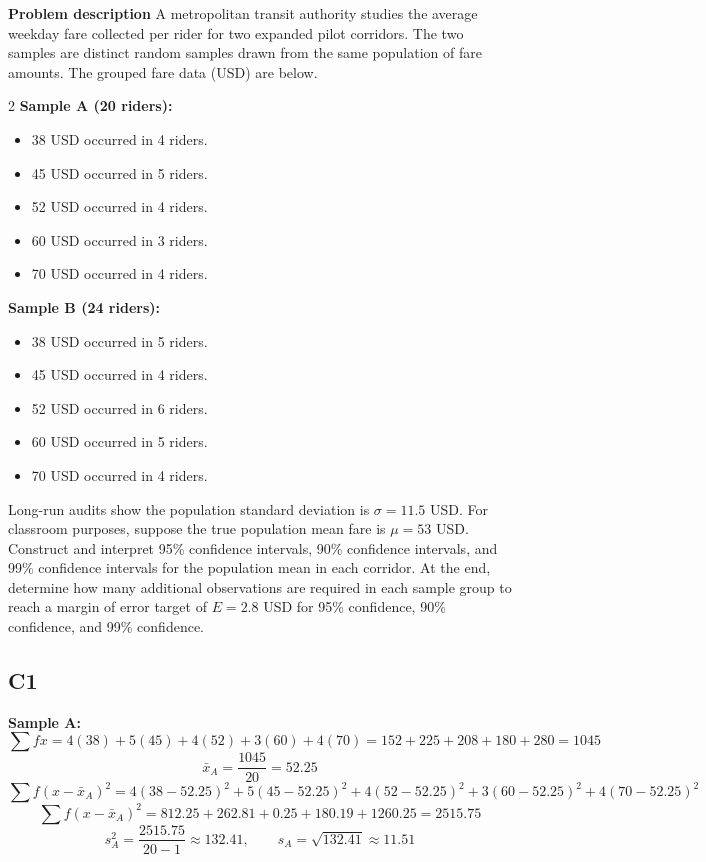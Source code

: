	\begin{ExamProblems}
		\newpage
		\item
		\textbf{Problem description}
		A metropolitan transit authority studies the average weekday fare collected per rider for two expanded pilot corridors.
		The two samples are distinct random samples drawn from the same population of fare amounts.
		The grouped fare data (USD) are below.
		
		\begin{multicols}{2}
			\textbf{Sample A (20 riders):}
			\begin{itemize}
				\item 38 USD occurred in 4 riders.
				\item 45 USD occurred in 5 riders.
				\item 52 USD occurred in 4 riders.
				\item 60 USD occurred in 3 riders.
				\item 70 USD occurred in 4 riders.
			\end{itemize}
			
			\columnbreak
			
			\textbf{Sample B (24 riders):}
			\begin{itemize}
				\item 38 USD occurred in 5 riders.
				\item 45 USD occurred in 4 riders.
				\item 52 USD occurred in 6 riders.
				\item 60 USD occurred in 5 riders.
				\item 70 USD occurred in 4 riders.
			\end{itemize}
		\end{multicols}
		
		Long-run audits show the population standard deviation is $\sigma = 11.5$ USD.
		For classroom purposes, suppose the true population mean fare is $\mu = 53$ USD.
		Construct and interpret 95\% confidence intervals, 90\% confidence intervals, and 99\% confidence intervals for the population mean in each corridor.
		At the end, determine how many additional observations are required in each sample group to reach a margin of error target of $E = 2.8$ USD for 95\% confidence, 90\% confidence, and 99\% confidence.
		
		\subsection*{C1}
		\textbf{Sample A:}
		\[
		\sum f x = 4(38) + 5(45) + 4(52) + 3(60) + 4(70) = 152 + 225 + 208 + 180 + 280 = 1045
		\]
		\[
		\bar{x}_A = \frac{1045}{20} = 52.25
		\]
		\[
		\sum f(x-\bar{x}_A)^2 = 4(38-52.25)^2 + 5(45-52.25)^2 + 4(52-52.25)^2 + 3(60-52.25)^2 + 4(70-52.25)^2
		\]
		\[
		\sum f(x-\bar{x}_A)^2 = 812.25 + 262.81 + 0.25 + 180.19 + 1260.25 = 2515.75
		\]
		\[
		s_A^2 = \frac{2515.75}{20-1} \approx 132.41, \qquad s_A = \sqrt{132.41} \approx 11.51
		\]
		

\end{ExamProblems}
